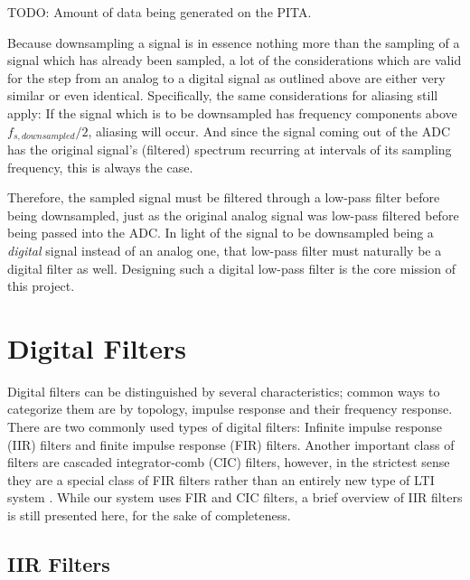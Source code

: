 TODO: Amount of data being generated on the PITA.

Because downsampling a signal is in  essence nothing more than the sampling of
a signal which has already been sampled, a lot of the considerations which are
valid for the  step from an analog  to a digital signal as  outlined above are
either very  similar or even identical. Specifically,  the same considerations
for  aliasing still  apply: If  the  signal which  is  to  be downsampled  has
frequency components  above $f_{s,  downsampled}/2$, aliasing  will occur. And
since the  signal coming out of  the ADC has the  original signal's (filtered)
spectrum recurring at intervals of its  sampling frequency, this is always the
case.

Therefore,  the sampled  signal must  be  filtered through  a low-pass  filter
before  being downsampled,  just as  the original  analog signal  was low-pass
filtered  before being  passed into  the  ADC. In light  of the  signal to  be
downsampled  being a  \emph{digital} signal  instead  of an  analog one,  that
low-pass filter must  naturally be a digital filter as  well. Designing such a
digital low-pass filter is the core mission of this project.


\section{Digital Filters}%
\label{sec:digital_filters}

Digital filters can  be distinguished by several  characteristics; common ways
to  categorize them  are by  topology,  impulse response  and their  frequency
response. There  are  two commonly  used  types  of digital  filters: Infinite
impulse   response   (IIR)  filters   and   finite   impulse  response   (FIR)
filters. Another important class of filters are cascaded integrator-comb (CIC)
filters,  however, in  the strictest  sense they  are a  special class  of FIR
filters rather than an entirely new  type of LTI system \cite{1163535}.  While
our system uses FIR and CIC filters,  a brief overview of IIR filters is still
presented here, for the sake of completeness.

\subsection{IIR Filters} %
\label{subsec:iir_filters}

